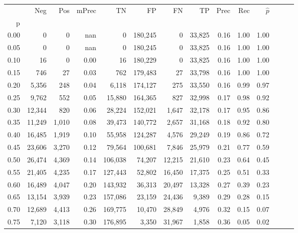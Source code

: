 \begin{tabular}{rrrrrrrrrrrrrr}
\toprule
{} &     Neg &    Pos & mPrec &       TN &       FP &      FN &      TP &  Prec &   Rec & $\hat{p}$ \\
p    &         &        &       &          &          &         &         &       &       &           \\
\midrule
0.00 &       0 &      0 &   nan &        0 &  180,245 &       0 &  33,825 &  0.16 &  1.00 &      1.00 \\
0.05 &       0 &      0 &   nan &        0 &  180,245 &       0 &  33,825 &  0.16 &  1.00 &      1.00 \\
0.10 &      16 &      0 &  0.00 &       16 &  180,229 &       0 &  33,825 &  0.16 &  1.00 &      1.00 \\
0.15 &     746 &     27 &  0.03 &      762 &  179,483 &      27 &  33,798 &  0.16 &  1.00 &      1.00 \\
0.20 &   5,356 &    248 &  0.04 &    6,118 &  174,127 &     275 &  33,550 &  0.16 &  0.99 &      0.97 \\
0.25 &   9,762 &    552 &  0.05 &   15,880 &  164,365 &     827 &  32,998 &  0.17 &  0.98 &      0.92 \\
0.30 &  12,344 &    820 &  0.06 &   28,224 &  152,021 &   1,647 &  32,178 &  0.17 &  0.95 &      0.86 \\
0.35 &  11,249 &  1,010 &  0.08 &   39,473 &  140,772 &   2,657 &  31,168 &  0.18 &  0.92 &      0.80 \\
0.40 &  16,485 &  1,919 &  0.10 &   55,958 &  124,287 &   4,576 &  29,249 &  0.19 &  0.86 &      0.72 \\
0.45 &  23,606 &  3,270 &  0.12 &   79,564 &  100,681 &   7,846 &  25,979 &  0.21 &  0.77 &      0.59 \\
0.50 &  26,474 &  4,369 &  0.14 &  106,038 &   74,207 &  12,215 &  21,610 &  0.23 &  0.64 &      0.45 \\
0.55 &  21,405 &  4,235 &  0.17 &  127,443 &   52,802 &  16,450 &  17,375 &  0.25 &  0.51 &      0.33 \\
0.60 &  16,489 &  4,047 &  0.20 &  143,932 &   36,313 &  20,497 &  13,328 &  0.27 &  0.39 &      0.23 \\
0.65 &  13,154 &  3,939 &  0.23 &  157,086 &   23,159 &  24,436 &   9,389 &  0.29 &  0.28 &      0.15 \\
0.70 &  12,689 &  4,413 &  0.26 &  169,775 &   10,470 &  28,849 &   4,976 &  0.32 &  0.15 &      0.07 \\
0.75 &   7,120 &  3,118 &  0.30 &  176,895 &    3,350 &  31,967 &   1,858 &  0.36 &  0.05 &      0.02 \\

\end{tabular}
